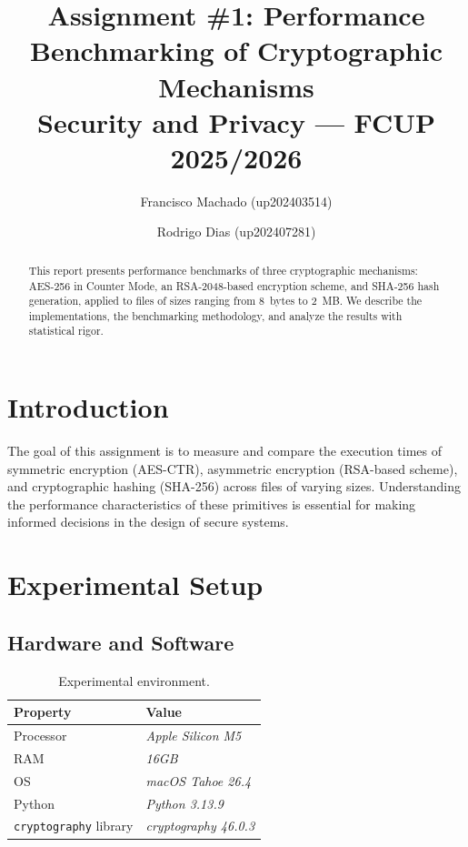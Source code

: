 \documentclass[10pt,a4paper]{article}
\title{%
    \textbf{Assignment \#1: Performance Benchmarking of Cryptographic Mechanisms} \\[0.5em]
    \large Security and Privacy --- FCUP 2025/2026
}
\author{
    Francisco Machado (up202403514) \and
    Rodrigo Dias (up202407281)
}
\begin{document}
\maketitle

\begin{abstract}
This report presents performance benchmarks of three cryptographic mechanisms: AES-256 in Counter Mode, an RSA-2048-based encryption scheme, and SHA-256 hash generation, applied to files of sizes ranging from 8~bytes to 2~MB. We describe the implementations, the benchmarking methodology, and analyze the results with statistical rigor.
\end{abstract}

\tableofcontents
\newpage

\section{Introduction}
\label{sec:intro}

The goal of this assignment is to measure and compare the execution times of symmetric encryption (AES-CTR), asymmetric encryption (RSA-based scheme), and cryptographic hashing (SHA-256) across files of varying sizes. Understanding the performance characteristics of these primitives is essential for making informed decisions in the design of secure systems.

\section{Experimental Setup}
\label{sec:setup}

\subsection{Hardware and Software}

\begin{table}[H]
    \centering
    \begin{tabular}{ll}
        \toprule
        \textbf{Property} & \textbf{Value} \\
        \midrule
        Processor   & \textit{Apple Silicon M5} \\
        RAM         & \textit{16GB} \\
        OS          & \textit{macOS Tahoe 26.4} \\
        Python      & \textit{Python 3.13.9} \\
        \texttt{cryptography} library & \textit{cryptography 46.0.3} \\
        \bottomrule
    \end{tabular}
    \caption{Experimental environment.}
    \label{tab:setup}
\end{table}
\end{document}
